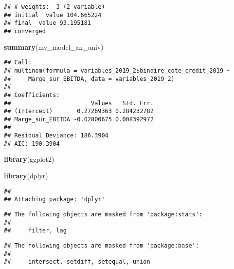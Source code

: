 \documentclass[
]{article}
\newenvironment{Shaded}{\begin{snugshade}}{\end{snugshade}}
\newcommand{\KeywordTok}[1]{\textcolor[rgb]{0.13,0.29,0.53}{\textbf{#1}}}
\newcommand{\NormalTok}[1]{#1}
\begin{document}
\begin{verbatim}
## # weights:  3 (2 variable)
## initial  value 104.665224 
## final  value 93.195181 
## converged
\end{verbatim}

\begin{Shaded}
\begin{Highlighting}[]
\KeywordTok{summary}\NormalTok{(my_model_an_univ)}
\end{Highlighting}
\end{Shaded}

\begin{verbatim}
## Call:
## multinom(formula = variables_2019_2$binaire_cote_credit_2019 ~ 
##     Marge_sur_EBITDA, data = variables_2019_2)
## 
## Coefficients:
##                       Values   Std. Err.
## (Intercept)       0.27269363 0.284232782
## Marge_sur_EBITDA -0.02800675 0.008392972
## 
## Residual Deviance: 186.3904 
## AIC: 190.3904
\end{verbatim}

\begin{Shaded}
\begin{Highlighting}[]
\KeywordTok{library}\NormalTok{(ggplot2)}


\KeywordTok{library}\NormalTok{(dplyr)}
\end{Highlighting}
\end{Shaded}

\begin{verbatim}
## 
## Attaching package: 'dplyr'
\end{verbatim}

\begin{verbatim}
## The following objects are masked from 'package:stats':
## 
##     filter, lag
\end{verbatim}

\begin{verbatim}
## The following objects are masked from 'package:base':
## 
##     intersect, setdiff, setequal, union
\end{verbatim}
\end{document}
